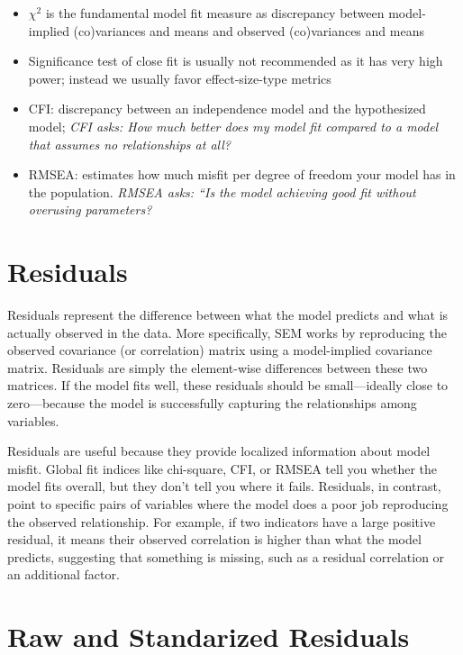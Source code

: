 \documentclass[
  letterpaper,
  DIV=11,
  numbers=noendperiod]{scrreprt}
\begin{document}
\begin{itemize}
\item
  \(\chi^2\) is the fundamental model fit measure as discrepancy between
  model-implied (co)variances and means and observed (co)variances and
  means
\item
  Significance test of close fit is usually not recommended as it has
  very high power; instead we usually favor effect-size-type metrics
\item
  CFI: discrepancy between an independence model and the hypothesized
  model; \emph{CFI asks: How much better does my model fit compared to a
  model that assumes no relationships at all?}
\item
  RMSEA: estimates how much misfit per degree of freedom your model has
  in the population. \emph{RMSEA asks: ``Is the model achieving good fit
  without overusing parameters?}
\end{itemize}

\section{Residuals}\label{residuals}

Residuals represent the difference between what the model predicts and
what is actually observed in the data. More specifically, SEM works by
reproducing the observed covariance (or correlation) matrix using a
model-implied covariance matrix. Residuals are simply the element-wise
differences between these two matrices. If the model fits well, these
residuals should be small---ideally close to zero---because the model is
successfully capturing the relationships among variables.

Residuals are useful because they provide localized information about
model misfit. Global fit indices like chi-square, CFI, or RMSEA tell you
whether the model fits overall, but they don't tell you where it fails.
Residuals, in contrast, point to specific pairs of variables where the
model does a poor job reproducing the observed relationship. For
example, if two indicators have a large positive residual, it means
their observed correlation is higher than what the model predicts,
suggesting that something is missing, such as a residual correlation or
an additional factor.

\section{Raw and Standarized
Residuals}\label{raw-and-standarized-residuals}
\end{document}
